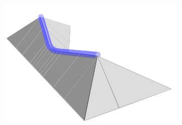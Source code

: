 \begin{figure}
\setlength{\figwidth}{.22\textwidth}
\setlength{\figwidthTwo}{.17\textwidth}
\setlength{\figwidthTree}{.22\textwidth}
\setlength{\tempheight}{-0.3cm}
\setlength{\tempheightTwo}{-0.5cm}
\begin{subfigure}{\figwidth}\centering
\hspace*{\tempheightTwo}
\includegraphics[height=\figheight]{sources/method/overview/surface/marking_cropped.png}

\vspace{\tempheight}


\end{subfigure}
\end{figure}
